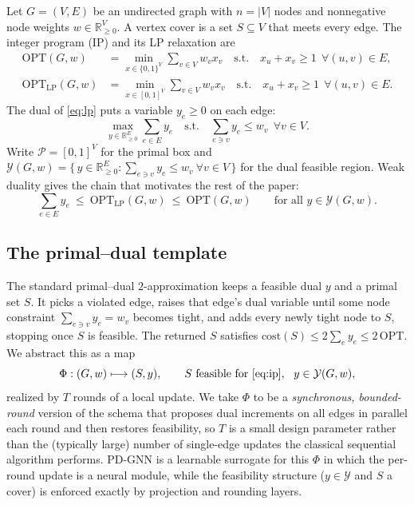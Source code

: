 \documentclass[11pt]{article}
\theoremstyle{plain}
\theoremstyle{definition}
\theoremstyle{remark}
\newcommand{\OPT}{\mathrm{OPT}}
\newcommand{\OPTLP}{\mathrm{OPT}_{\mathrm{LP}}}
\newcommand{\cost}{\mathrm{cost}}
\newcommand{\Ycal}{\mathcal{Y}}
\newcommand{\Pcal}{\mathcal{P}}
\newcommand{\real}{\mathbb{R}}
\newcommand{\PDGNN}{\textsc{PD-GNN}}
\begin{document}
Let $G=(V,E)$ be an undirected graph with $n=|V|$ nodes and nonnegative node
weights $w\in\real_{\ge 0}^V$. A vertex cover is a set $S\subseteq V$ that meets
every edge. The integer program (IP) and its LP relaxation are
\begin{align}
\OPT(G,w) &= \min_{x\in\{0,1\}^V} \sum_{v\in V} w_v x_v
   \quad\text{s.t.}\quad x_u+x_v\ge 1 \ \ \forall (u,v)\in E, \label{eq:ip}\\
\OPTLP(G,w) &= \min_{x\in[0,1]^V} \sum_{v\in V} w_v x_v
   \quad\text{s.t.}\quad x_u+x_v\ge 1 \ \ \forall (u,v)\in E. \label{eq:lp}
\end{align}
The dual of \eqref{eq:lp} puts a variable $y_e\ge 0$ on each edge:
\begin{equation}
\max_{y\in\real_{\ge0}^E} \sum_{e\in E} y_e
   \quad\text{s.t.}\quad \sum_{e\ni v} y_e \le w_v \ \ \forall v\in V. \label{eq:dual}
\end{equation}
Write $\Pcal=[0,1]^V$ for the primal box and
$\Ycal(G,w)=\bigl\{\,y\in\real_{\ge0}^E : \sum_{e\ni v} y_e\le w_v\ \forall v\in V\,\bigr\}$
for the dual feasible region. Weak duality gives the chain that motivates the
rest of the paper:
\begin{equation}
\sum_{e\in E} y_e \ \le\ \OPTLP(G,w) \ \le\ \OPT(G,w)
   \qquad\text{for all } y\in\Ycal(G,w). \label{eq:weak}
\end{equation}

\subsection{The primal--dual template}
The standard primal--dual $2$-approximation keeps a feasible dual $y$ and a
primal set $S$. It picks a violated edge, raises that edge's dual variable until
some node constraint $\sum_{e\ni v} y_e=w_v$ becomes tight, and adds every newly
tight node to $S$, stopping once $S$ is feasible. The returned $S$ satisfies
$\cost(S)\le 2\sum_e y_e\le 2\,\OPT$. We abstract this as a map
\begin{equation}
\Phi:(G,w)\longmapsto (S,y),\qquad S\text{ feasible for \eqref{eq:ip}},\ \ y\in\Ycal(G,w),\label{eq:phi}
\end{equation}
realized by $T$ rounds of a local update. We take $\Phi$ to be a
\emph{synchronous, bounded-round} version of the schema that proposes dual
increments on all edges in parallel each round and then restores feasibility, so
$T$ is a small design parameter rather than the (typically large) number of
single-edge updates the classical sequential algorithm performs. \PDGNN{} is a
learnable surrogate for this $\Phi$ in which the per-round update is a neural
module, while the feasibility structure ($y\in\Ycal$ and $S$ a cover) is
enforced exactly by projection and rounding layers.
\end{document}
